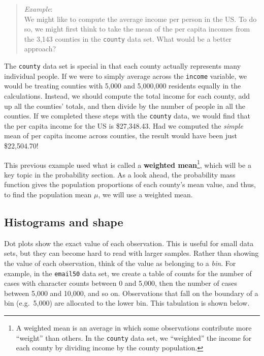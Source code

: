 \documentclass[
  letterpaper,
  DIV=11,
  numbers=noendperiod]{scrreprt}
\begin{document}
\begin{quote}
\emph{Example}:\\
We might like to compute the average income per person in the US. To do
so, we might first think to take the mean of the per capita incomes from
the 3,143 counties in the \texttt{county} data set. What would be a
better approach?
\end{quote}

The \texttt{county} data set is special in that each county actually
represents many individual people. If we were to simply average across
the \texttt{income} variable, we would be treating counties with 5,000
and 5,000,000 residents equally in the calculations. Instead, we should
compute the total income for each county, add up all the counties'
totals, and then divide by the number of people in all the counties. If
we completed these steps with the \texttt{county} data, we would find
that the per capita income for the US is \$27,348.43. Had we computed
the \emph{simple} mean of per capita income across counties, the result
would have been just \$22,504.70!

This previous example used what is called a \textbf{weighted
mean}\footnote{A weighted mean is an average in which some observations
  contribute more ``weight'' than others. In the \texttt{county} data
  set, we ``weighted'' the income for each county by dividing income by
  the county population.}, which will be a key topic in the probability
section. As a look ahead, the probability mass function gives the
population proportions of each county's mean value, and thus, to find
the population mean \(\mu\), we will use a weighted mean.

\subsection{Histograms and shape}\label{histograms-and-shape}

Dot plots show the exact value of each observation. This is useful for
small data sets, but they can become hard to read with larger samples.
Rather than showing the value of each observation, think of the value as
belonging to a \emph{bin}. For example, in the \texttt{email50} data
set, we create a table of counts for the number of cases with character
counts between 0 and 5,000, then the number of cases between 5,000 and
10,000, and so on. Observations that fall on the boundary of a bin
(e.g.~5,000) are allocated to the lower bin. This tabulation is shown
below.
\end{document}
